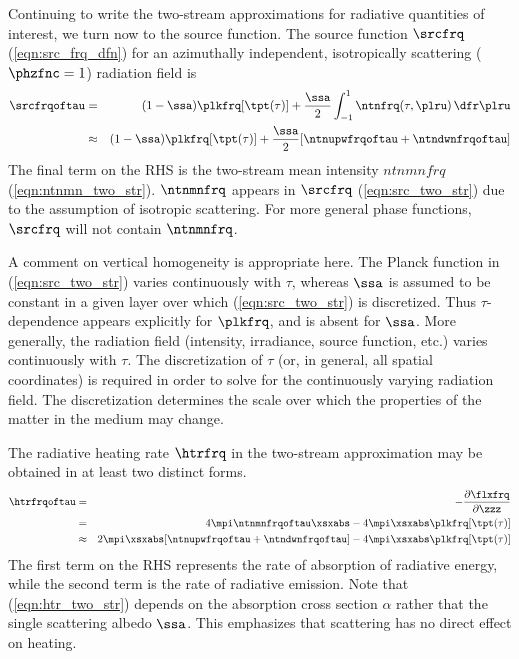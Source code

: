 \documentclass[12pt]{article}
\begin{document}
Continuing to write the two-stream approximations for radiative
quantities of interest, we turn now to the source function.
The source function $\srcfrq$ (\ref{eqn:src_frq_dfn}) for an azimuthally
independent, isotropically scattering ($\phzfnc = 1$) radiation field is  
\begin{eqnarray}
\srcfrqoftau
& = & 
(1-\ssa)\plkfrq[\tpt(\tau)] + \frac{\ssa}{2} 
\int_{-1}^{1} \ntnfrq(\tau,\plru) \,\dfr\plru \nonumber \\
& \approx & 
(1-\ssa)\plkfrq[\tpt(\tau)] + \frac{\ssa}{2}
[\ntnupwfrqoftau + \ntndwnfrqoftau]
\label{eqn:src_two_str}
\end{eqnarray}
The final term on the RHS is the two-stream mean intensity $ntnmnfrq$ 
(\ref{eqn:ntnmn_two_str}).
$\ntnmnfrq$ appears in $\srcfrq$ (\ref{eqn:src_two_str}) due to the 
assumption of isotropic scattering. 
For more general phase functions, $\srcfrq$ will not contain
$\ntnmnfrq$. 

A comment on vertical homogeneity is appropriate here.
The Planck function in (\ref{eqn:src_two_str}) varies
continuously with $\tau$, whereas $\ssa$ is assumed to be constant in
a given layer over which (\ref{eqn:src_two_str}) is discretized.
Thus $\tau$-dependence appears explicitly for $\plkfrq$, and is absent
for $\ssa$.
More generally, the radiation field (intensity, irradiance, source
function, etc.) varies continuously with $\tau$.
The discretization of $\tau$ (or, in general, all spatial coordinates) 
is required in order to solve for the continuously varying radiation
field. 
The discretization determines the scale over which the properties of
the matter in the medium may change.

The radiative heating rate $\htrfrq$ in the two-stream approximation
may be obtained in at least two distinct forms.
\begin{eqnarray}
\htrfrqoftau
& = & 
-\frac{\partial \flxfrq}{\partial \zzz} \nonumber \\
& = & 
4\mpi \ntnmnfrqoftau \xsxabs - 4\mpi \xsxabs \plkfrq[\tpt(\tau)] \nonumber \\
& \approx & 
2 \mpi \xsxabs [ \ntnupwfrqoftau + \ntndwnfrqoftau ] 
- 4\mpi \xsxabs \plkfrq[\tpt(\tau)]
\label{eqn:htr_two_str}
\end{eqnarray}
The first term on the RHS represents the rate of absorption of
radiative energy, while the second term is the rate of radiative
emission. 
Note that (\ref{eqn:htr_two_str}) depends on the absorption cross
section $\alpha$ rather that the single scattering albedo $\ssa$.
This emphasizes that scattering has no direct effect on heating.
\end{document}
